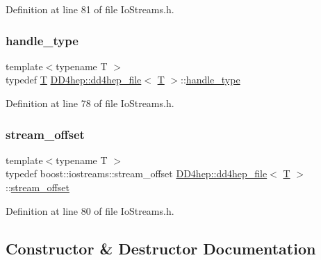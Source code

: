 Definition at line 81 of file Io\+Streams.\+h.

\hypertarget{class_d_d4hep_1_1dd4hep__file_a4d79f8d433cd7831ff818691424cd6fc}{}\label{class_d_d4hep_1_1dd4hep__file_a4d79f8d433cd7831ff818691424cd6fc} 
\subsubsection{\texorpdfstring{handle\+\_\+type}{handle\_type}}
{\footnotesize\ttfamily template$<$typename T $>$ \\
typedef \hyperlink{class_t}{T} \hyperlink{class_d_d4hep_1_1dd4hep__file}{D\+D4hep\+::dd4hep\+\_\+file}$<$ \hyperlink{class_t}{T} $>$\+::\hyperlink{class_d_d4hep_1_1dd4hep__file_a4d79f8d433cd7831ff818691424cd6fc}{handle\+\_\+type}}



Definition at line 78 of file Io\+Streams.\+h.

\hypertarget{class_d_d4hep_1_1dd4hep__file_a28e1531542193871075e8b7f47818113}{}\label{class_d_d4hep_1_1dd4hep__file_a28e1531542193871075e8b7f47818113} 
\subsubsection{\texorpdfstring{stream\+\_\+offset}{stream\_offset}}
{\footnotesize\ttfamily template$<$typename T $>$ \\
typedef boost\+::iostreams\+::stream\+\_\+offset \hyperlink{class_d_d4hep_1_1dd4hep__file}{D\+D4hep\+::dd4hep\+\_\+file}$<$ \hyperlink{class_t}{T} $>$\+::\hyperlink{class_d_d4hep_1_1dd4hep__file_a28e1531542193871075e8b7f47818113}{stream\+\_\+offset}}



Definition at line 80 of file Io\+Streams.\+h.



\subsection{Constructor \& Destructor Documentation}
\hypertarget{class_d_d4hep_1_1dd4hep__file_ac14f4f89341ab662c41c0b1de784c458}{}\label{class_d_d4hep_1_1dd4hep__file_ac14f4f89341ab662c41c0b1de784c458} 
